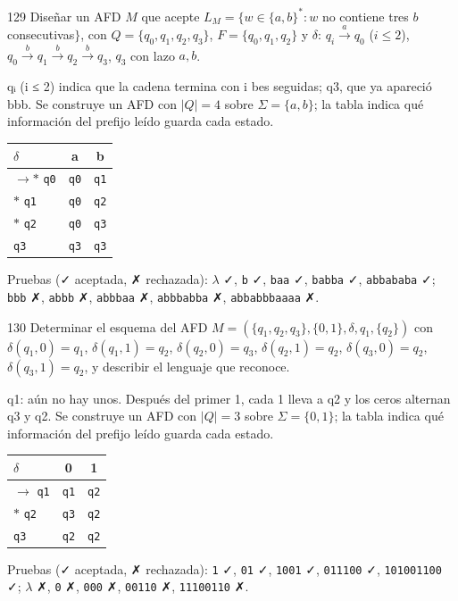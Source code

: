 \documentclass[11pt]{article}
\begin{document}
\begin{ejercicio}{129}{}
Diseñar un AFD $M$ que acepte $L_M = \{w \in \{a, b\}^* : w$ no contiene tres $b$ consecutivas$\}$, con $Q = \{q_0, q_1, q_2, q_3\}$, $F = \{q_0, q_1, q_2\}$ y $\delta$: $q_i \xrightarrow{a} q_0$ ($i \le 2$), $q_0 \xrightarrow{b} q_1 \xrightarrow{b} q_2 \xrightarrow{b} q_3$, $q_3$ con lazo $a, b$.
\end{ejercicio}
\proc qᵢ (i ≤ 2) indica que la cadena termina con i bes seguidas; q3, que ya apareció bbb. Se construye un AFD con $|Q| = 4$ sobre $\Sigma = \{a, b\}$; la tabla indica qué información del prefijo leído guarda cada estado.
\begin{center}\small\begin{tabular}{lcc}\toprule
$\delta$ & a & b \\\midrule
$\to$$*$ \texttt{q0} & \texttt{q0} & \texttt{q1} \\
$*$ \texttt{q1} & \texttt{q0} & \texttt{q2} \\
$*$ \texttt{q2} & \texttt{q0} & \texttt{q3} \\
 \texttt{q3} & \texttt{q3} & \texttt{q3} \\
\bottomrule\end{tabular}\end{center}
Pruebas (✓ aceptada, ✗ rechazada): $\lambda$ ✓, \texttt{b} ✓, \texttt{baa} ✓, \texttt{babba} ✓, \texttt{abbababa} ✓; \texttt{bbb} ✗, \texttt{abbb} ✗, \texttt{abbbaa} ✗, \texttt{abbbabba} ✗, \texttt{abbabbbaaaa} ✗.



\begin{ejercicio}{130}{}
Determinar el esquema del AFD $M = (\{q_1, q_2, q_3\}, \{0, 1\}, \delta, q_1, \{q_2\})$ con $\delta(q_1,0)=q_1$, $\delta(q_1,1)=q_2$, $\delta(q_2,0)=q_3$, $\delta(q_2,1)=q_2$, $\delta(q_3,0)=q_2$, $\delta(q_3,1)=q_2$, y describir el lenguaje que reconoce.
\end{ejercicio}
\proc q1: aún no hay unos. Después del primer 1, cada 1 lleva a q2 y los ceros alternan q3 y q2. Se construye un AFD con $|Q| = 3$ sobre $\Sigma = \{0, 1\}$; la tabla indica qué información del prefijo leído guarda cada estado.
\begin{center}\small\begin{tabular}{lcc}\toprule
$\delta$ & 0 & 1 \\\midrule
$\to$ \texttt{q1} & \texttt{q1} & \texttt{q2} \\
$*$ \texttt{q2} & \texttt{q3} & \texttt{q2} \\
 \texttt{q3} & \texttt{q2} & \texttt{q2} \\
\bottomrule\end{tabular}\end{center}
Pruebas (✓ aceptada, ✗ rechazada): \texttt{1} ✓, \texttt{01} ✓, \texttt{1001} ✓, \texttt{011100} ✓, \texttt{101001100} ✓; $\lambda$ ✗, \texttt{0} ✗, \texttt{000} ✗, \texttt{00110} ✗, \texttt{11100110} ✗.
\end{document}
